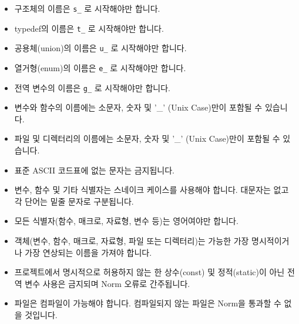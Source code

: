 \documentclass{42-ko}
\begin{document}
        \begin{itemize}

            \item 구조체의 이름은 \texttt{s\_} 로 시작해야만 합니다.

            \item typedef의 이름은 \texttt{t\_} 로 시작해야만 합니다.

            \item 공용체(union)의 이름은 \texttt{u\_} 로 시작해야만 합니다.

            \item 열거형(enum)의 이름은 \texttt{e\_} 로 시작해야만 합니다.

            \item 전역 변수의 이름은 \texttt{g\_} 로 시작해야만 합니다.

            \item 변수와 함수의 이름에는 소문자, 숫자 및
            '\_' (Unix Case)만이 포함될 수 있습니다.

            \item 파일 및 디렉터리의 이름에는 소문자, 숫자 및
            '\_' (Unix Case)만이 포함될 수 있습니다.

            \item 표준 ASCII 코드표에 없는 문자는 금지됩니다.

            \item 변수, 함수 및 기타 식별자는 스네이크 케이스를 사용해야 합니다.
                대문자는 없고 각 단어는 밑줄 문자로 구분됩니다.

            \item 모든 식별자(함수, 매크로, 자료형, 변수 등)는 영어여야만 합니다.

            \item 객체(변수, 함수, 매크로, 자료형, 파일 또는 디렉터리)는
                가능한 가장 명시적이거나 가장 연상되는 이름을 가져야 합니다.

            \item 프로젝트에서 명시적으로 허용하지 않는 한
                상수(const) 및 정적(static)이 아닌 전역 변수 사용은 금지되며
                Norm 오류로 간주됩니다.

            \item 파일은 컴파일이 가능해야 합니다. 컴파일되지 않는 파일은
                Norm을 통과할 수 없을 것입니다.
        \end{itemize}
\newpage

\end{document}
